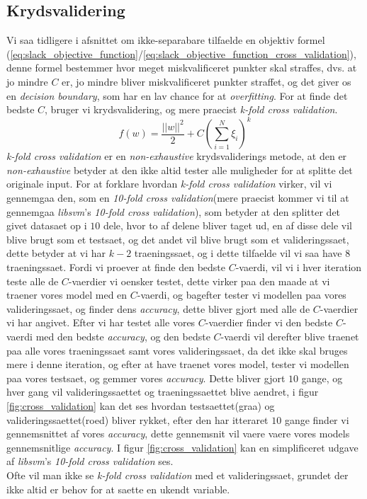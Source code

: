 \documentclass{article}
\begin{document}
\subsection{Krydsvalidering}
Vi saa tidligere i afsnittet om ikke-separabare tilfaelde en objektiv formel (\ref{eq:slack_objective_function}/\ref{eq:slack_objective_function_cross_validation}), denne formel bestemmer hvor meget miskvalificeret punkter skal straffes, dvs. at jo mindre $C$ er, jo mindre bliver miskvalificeret punkter straffet, og det giver os en \textit{decision boundary}, som har en lav chance for at \textit{overfitting}. For at finde det bedste $C$, bruger vi krydsvalidering, og mere praecist \textit{k-fold cross validation}.
\begin{equation}
f(w) = \frac{||w||^2}{2}+C(\sum\limits_{i=1}^N \xi_i)^k
\label{eq:slack_objective_function_cross_validation}
\end{equation}
\textit{k-fold cross validation} er en \textit{non-exhaustive} krydsvaliderings metode, at den er \textit{non-exhaustive} betyder at den ikke altid tester alle muligheder for at splitte det originale input. For at forklare hvordan \textit{k-fold cross validation} virker, vil vi gennemgaa den, som en \textit{10-fold cross validation}(mere praecist kommer vi til at gennemgaa \textit{libsvm}'s \textit{10-fold cross validation}), som betyder at den splitter det givet datasaet op i $10$ dele, hvor to af delene bliver taget ud, en af disse dele vil blive brugt som et testsaet, og det andet vil blive brugt som et valideringssaet, dette betyder at vi har $k-2$ traeningssaet, og i dette tilfaelde vil vi saa have $8$ traeningssaet. Fordi vi proever at finde den bedste $C$-vaerdi, vil vi i hver iteration teste alle de $C$-vaerdier vi oensker testet, dette virker paa den maade at vi traener vores model med en $C$-vaerdi, og bagefter tester vi modellen paa vores valideringssaet, og finder dens \textit{accuracy}, dette bliver gjort med alle de $C$-vaerdier vi har angivet. Efter vi har testet alle vores $C$-vaerdier finder vi den bedste $C$-vaerdi med den bedste \textit{accuracy}, og den bedste $C$-vaerdi vil derefter blive traenet paa alle vores traeningssaet samt vores valideringssaet, da det ikke skal bruges mere i denne iteration, og efter at have traenet vores model, tester vi modellen paa vores testsaet, og gemmer vores \textit{accuracy}. Dette bliver gjort $10$ gange, og hver gang vil valideringssaettet og traeningssaettet blive aendret, i figur \ref{fig:cross_validation} kan det ses hvordan testsaettet(graa) og valideringssaettet(roed) bliver rykket, efter den har itteraret $10$ gange finder vi gennemsnittet af vores \textit{accuracy}, dette gennemsnit vil vaere vaere vores models gennemsnitlige \textit{accuracy}. I figur \ref{fig:cross_validation} kan en simplificeret udgave af \textit{libsvm}'s \textit{10-fold cross validation} ses. \\
Ofte vil man ikke se \textit{k-fold cross validation} med et valideringssaet, grundet der ikke altid er behov for at saette en ukendt variable.
\end{document}
